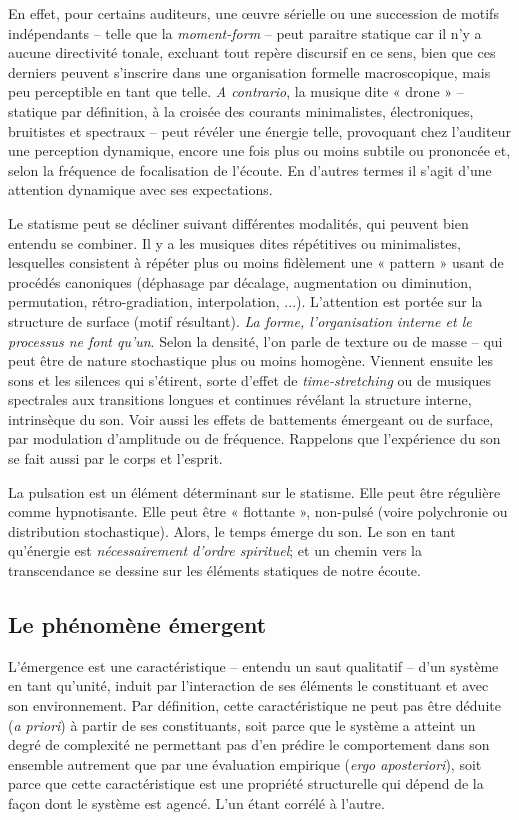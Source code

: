 \documentclass{article}
\begin{document}
En effet, pour certains auditeurs, une œuvre sérielle ou une succession de motifs indépendants -- telle que la \textit{moment-form} -- peut paraitre statique car il n'y a aucune directivité tonale, excluant tout repère discursif en ce sens, bien que ces derniers peuvent s'inscrire dans une organisation formelle macroscopique, mais peu perceptible en tant que telle. \textit{A contrario}, la musique dite « drone »  -- statique par définition, à la croisée des courants minimalistes, électroniques, bruitistes et spectraux -- peut révéler une énergie telle, provoquant chez l'auditeur une perception dynamique, encore une fois plus ou moins subtile ou prononcée et, selon la fréquence de focalisation de l'écoute. En d'autres termes il s'agit d'une attention dynamique avec ses expectations.

Le statisme peut se décliner suivant différentes modalités, qui peuvent bien entendu se combiner. Il y a les musiques dites répétitives ou minimalistes, lesquelles consistent à répéter plus ou moins fidèlement une « pattern » usant de procédés canoniques (déphasage par décalage, augmentation ou diminution, permutation, rétro-gradiation, interpolation, ...). L'attention est portée sur la structure de surface (motif résultant). \textit{La  forme, l'organisation interne et le processus ne font qu'un}. Selon la densité, l'on parle de texture ou de masse -- qui peut être de nature stochastique plus ou moins homogène. Viennent ensuite les sons et les silences qui s'étirent, sorte d'effet de \textit{time-stretching} ou de musiques spectrales aux transitions longues et continues révélant la structure interne, intrinsèque du son. Voir aussi les effets de battements émergeant ou de surface, par modulation d'amplitude ou de fréquence. Rappelons que l'expérience du son se fait aussi par le corps et l'esprit. 

La pulsation est un élément déterminant sur le statisme. Elle peut être régulière comme hypnotisante. Elle peut être « flottante », non-pulsé (voire polychronie ou distribution stochastique). Alors, le temps émerge du son. Le son en tant qu'énergie est \textit{nécessairement d’ordre spirituel}; et un chemin vers la transcendance se dessine sur les éléments statiques de notre écoute.

\subsection*{Le phénomène émergent}
 
 L'émergence est une caractéristique -- entendu un saut qualitatif -- d'un système en tant qu'unité, induit par l'interaction de ses éléments le constituant et avec son environnement. Par définition, cette caractéristique ne peut pas être déduite (\textit{a priori}) à partir de ses constituants, soit parce que le système a atteint un degré de complexité ne permettant pas d'en prédire le comportement dans son ensemble autrement que par une évaluation empirique (\textit{ergo aposteriori}), soit parce que cette caractéristique est une propriété structurelle qui dépend de la façon dont le système est agencé. 
 L'un étant corrélé à l'autre.
\end{document}
